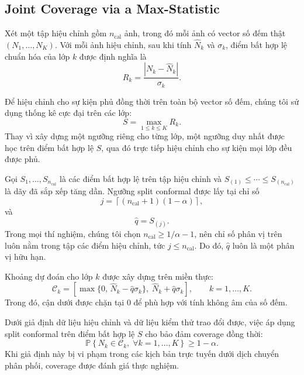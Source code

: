 \documentclass[pdflatex,sn-mathphys-num]{sn-jnl}
\begin{document}
\subsection{Joint Coverage via a Max-Statistic}\label{sec:jci}

Xét một tập hiệu chỉnh gồm \(n_{\mathrm{cal}}\) ảnh, trong đó mỗi ảnh có vector số
đếm thật \((N_1,\dots,N_K)\). Với mỗi ảnh hiệu chỉnh, sau khi tính
\(\hat{N}_k\) và \(\sigma_k\), điểm bất hợp lệ chuẩn hóa của lớp \(k\) được định nghĩa
là
\begin{equation}
R_k = \frac{|N_k-\hat{N}_k|}{\sigma_k}.
\end{equation}

Để hiệu chỉnh cho sự kiện phủ đồng thời trên toàn bộ vector số đếm, chúng tôi sử dụng
thống kê cực đại trên các lớp:
\begin{equation}
S = \max_{1\leq k\leq K} R_k.
\end{equation}
Thay vì xây dựng một ngưỡng riêng cho từng lớp, một ngưỡng duy nhất được học trên
điểm bất hợp lệ \(S\), qua đó trực tiếp hiệu chỉnh cho sự kiện mọi lớp đều được phủ.

Gọi \(S_1,\dots,S_{n_{\mathrm{cal}}}\) là các điểm bất hợp lệ trên tập hiệu chỉnh và
\(S_{(1)}\leq \cdots \leq S_{(n_{\mathrm{cal}})}\) là dãy đã sắp xếp tăng dần. Ngưỡng
split conformal được lấy tại chỉ số
\begin{equation}
j = \left\lceil (n_{\mathrm{cal}}+1)(1-\alpha) \right\rceil,
\end{equation}
và
\begin{equation}
\hat{q} = S_{(j)}.
\end{equation}
Trong mọi thí nghiệm, chúng tôi chọn \(n_{\mathrm{cal}} \ge 1/\alpha - 1\), nên chỉ số
phân vị trên luôn nằm trong tập các điểm hiệu chỉnh, tức \(j \le n_{\mathrm{cal}}\).
Do đó, \(\hat q\) luôn là một phân vị hữu hạn.

Khoảng dự đoán cho lớp \(k\) được xây dựng trên miền thực:
\begin{equation}
\mathcal{C}_k
=
\left[
\max\{0,\,\hat{N}_k-\hat{q}\sigma_k\},\;
\hat{N}_k+\hat{q}\sigma_k
\right],
\qquad k=1,\dots,K.
\end{equation}
Trong đó, cận dưới được chặn tại 0 để phù hợp với tính không âm của số đếm.

Dưới giả định dữ liệu hiệu chỉnh và dữ liệu kiểm thử trao đổi được, việc áp dụng
split conformal trên điểm bất hợp lệ \(S\) cho bảo đảm coverage đồng thời:
\begin{equation}
\mathbb{P}\left\{
N_k \in \mathcal{C}_k,\; \forall k=1,\dots,K
\right\}
\geq 1-\alpha.
\end{equation}
Khi giả định này bị vi phạm trong các kịch bản trực tuyến dưới dịch chuyển phân phối,
coverage được đánh giá thực nghiệm.
\end{document}
